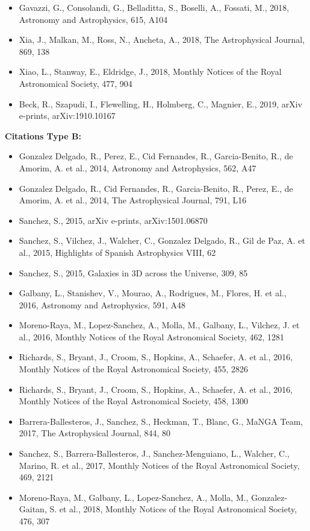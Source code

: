 \documentclass{letter}
\begin{document}
\begin{enumerate}
\begin{itemize}
\item Gavazzi, G., Consolandi, G., Belladitta, S., Boselli, A., Fossati, M., 2018, Astronomy and Astrophysics, 615, A104
\item Xia, J., Malkan, M., Ross, N., Ancheta, A., 2018, The Astrophysical Journal, 869, 138
\item Xiao, L., Stanway, E., Eldridge, J., 2018, Monthly Notices of the Royal Astronomical Society, 477, 904
\item Beck, R., Szapudi, I., Flewelling, H., Holmberg, C., Magnier, E., 2019, arXiv e-prints, arXiv:1910.10167
\end{itemize}
{\bf Citations Type B:}
\begin{itemize}
\item Gonzalez Delgado, R., Perez, E., Cid Fernandes, R., Garcia-Benito, R., de Amorim, A. et al., 2014, Astronomy and Astrophysics, 562, A47
\item Gonzalez Delgado, R., Cid Fernandes, R., Garcia-Benito, R., Perez, E., de Amorim, A. et al., 2014, The Astrophysical Journal, 791, L16
\item Sanchez, S., 2015, arXiv e-prints, arXiv:1501.06870
\item Sanchez, S., Vilchez, J., Walcher, C., Gonzalez Delgado, R., Gil de Paz, A. et al., 2015, Highlights of Spanish Astrophysics VIII, 62
\item Sanchez, S., 2015, Galaxies in 3D across the Universe, 309, 85
\item Galbany, L., Stanishev, V., Mourao, A., Rodrigues, M., Flores, H. et al., 2016, Astronomy and Astrophysics, 591, A48
\item Moreno-Raya, M., Lopez-Sanchez, A., Molla, M., Galbany, L., Vilchez, J. et al., 2016, Monthly Notices of the Royal Astronomical Society, 462, 1281
\item Richards, S., Bryant, J., Croom, S., Hopkins, A., Schaefer, A. et al., 2016, Monthly Notices of the Royal Astronomical Society, 455, 2826
\item Richards, S., Bryant, J., Croom, S., Hopkins, A., Schaefer, A. et al., 2016, Monthly Notices of the Royal Astronomical Society, 458, 1300
\item Barrera-Ballesteros, J., Sanchez, S., Heckman, T., Blanc, G., MaNGA Team, 2017, The Astrophysical Journal, 844, 80
\item Sanchez, S., Barrera-Ballesteros, J., Sanchez-Menguiano, L., Walcher, C., Marino, R. et al., 2017, Monthly Notices of the Royal Astronomical Society, 469, 2121
\item Moreno-Raya, M., Galbany, L., Lopez-Sanchez, A., Molla, M., Gonzalez-Gaitan, S. et al., 2018, Monthly Notices of the Royal Astronomical Society, 476, 307

\end{itemize}
\end{enumerate}
\end{document}
